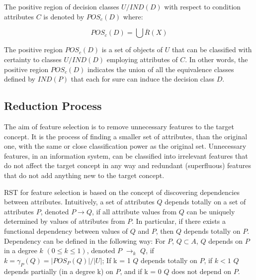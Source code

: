 \documentclass{llncs}
\begin{document}
The positive region of decision classes $U/IND(D)$ with respect to condition attributes $C$ is denoted by $POS_c(D)$ where:

\begin{displaymath}
POS_c(D) = \bigcup \overline{R}(X)
\end{displaymath}

The positive region $POS_c(D)$ is a set of objects  of $U$ that can be classified with certainty to classes $U/IND(D)$ employing attributes of $C$. In other words, the positive region $POS_c(D)$ indicates the union of all the equivalence classes defined by $IND(P)$ that each for sure can induce the decision class $D$.

\subsection{Reduction Process}

The aim of feature selection is to remove unnecessary features to the target concept. It is the process of finding a smaller set of attributes, than the original one, with the same or close classification power as the original set. Unnecessary features, in an information system, can be classified into irrelevant features  that do not affect the target concept in any way  and redundant (superfluous) features that do not add anything new to the target concept.

RST for feature selection is based on the concept of  discovering dependencies between attributes. Intuitively, a set of attributes $Q$ depends totally on a set of attributes $P$, denoted $P \rightarrow Q$, if all attribute values from $Q$ can be uniquely determined by values of attributes from $P$. In particular, if there exists a functional dependency between values of $Q$ and $P$, then $Q$ depends totally on $P$. Dependency can be defined in the following way: For $P$, $Q  \subset A$, $Q$  depends on $P$ in a degree $k$ $(0 \leq k \leq 1)$,  denoted $P$ $\rightarrow_{k}$ $Q$, if $k = \gamma_{P}(Q) = |POS_{P}(Q)|/|U|$;  If k = 1 $Q$ depends totally on $P$, if $k < 1 $  $Q$ depends partially (in a degree k) on $P$, and if k = 0 $Q$ does not depend on $P$.
\end{document}
